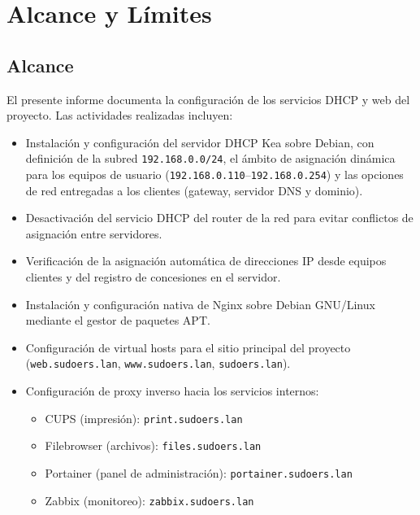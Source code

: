 
\section{Alcance y Límites}

\subsection{Alcance}

El presente informe documenta la configuración de los servicios DHCP y web
del proyecto. Las actividades realizadas incluyen:

\begin{itemize}
  \item Instalación y configuración del servidor DHCP Kea sobre Debian, con
        definición de la subred \texttt{192.168.0.0/24}, el ámbito de
        asignación dinámica para los equipos de usuario
        (\texttt{192.168.0.110}--\texttt{192.168.0.254}) y las opciones de
        red entregadas a los clientes (gateway, servidor DNS y dominio).
  \item Desactivación del servicio DHCP del router de la red para evitar
        conflictos de asignación entre servidores.
  \item Verificación de la asignación automática de direcciones IP desde
        equipos clientes y del registro de concesiones en el servidor.
  \item Instalación y configuración nativa de Nginx sobre Debian GNU/Linux
        mediante el gestor de paquetes APT.
  \item Configuración de virtual hosts para el sitio principal del proyecto
        (\texttt{web.sudoers.lan}, \texttt{www.sudoers.lan},
        \texttt{sudoers.lan}).
  \item Configuración de proxy inverso hacia los servicios internos:
        \begin{itemize}
          \item CUPS (impresión): \texttt{print.sudoers.lan}
          \item Filebrowser (archivos): \texttt{files.sudoers.lan}
          \item Portainer (panel de administración): \texttt{portainer.sudoers.lan}
          \item Zabbix (monitoreo): \texttt{zabbix.sudoers.lan}

\end{itemize}
\end{itemize}
